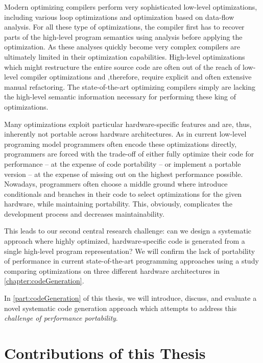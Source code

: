 Modern optimizing compilers perform very sophisticated low-level optimizations, including various loop optimizations and optimization based on data-flow analysis.
For all these type of optimizations, the compiler first has to recover parts of the high-level program semantics using analysis before applying the optimization.
As these analyses quickly become very complex compilers are ultimately limited in their optimization capabilities.
High-level optimizations which might restructure the entire source code are often out of the reach of low-level compiler optimizations and ,therefore, require explicit and often extensive manual refactoring.
The state-of-the-art optimizing compilers simply are lacking the high-level semantic information necessary for performing these king of optimizations.

Many optimizations exploit particular hardware-specific features and are, thus, inherently not portable across hardware architectures.
As in current low-level programing model programmers often encode these optimizations directly, programmers are forced with the trade-off of either fully optimize their code for performance -- at the expense of code portability -- or implement a portable version -- at the expense of missing out on the highest performance possible.
Nowadays, programmers often choose a middle ground where introduce conditionals and branches in their code to select optimizations for the given hardware, while maintaining portability.
This, obviously, complicates the development process and decreases maintainability.

This leads to our second central research challenge:
can we design a systematic approach where highly optimized, hardware-specific code is generated from a single high-level program representation?
We will confirm the lack of portability of performance in current state-of-the-art programming approaches using a study comparing optimizations on three different hardware architectures in \autoref{chapter:codeGeneration}.

In \autoref{part:codeGeneration} of this thesis, we will introduce, discuss, and evaluate a novel systematic code generation approach which attempts to address this \emph{challenge of performance portability}.


\section{Contributions of this Thesis}

